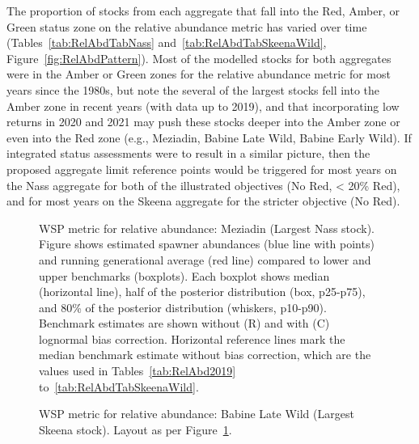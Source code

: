 \documentclass[french,11pt]{book}
\begin{document}
The proportion of stocks from each aggregate that fall into the Red, Amber, or Green status zone on the relative abundance metric has varied over time (Tables~\ref{tab:RelAbdTabNass} and~\ref{tab:RelAbdTabSkeenaWild}, Figure~\ref{fig:RelAbdPattern}). Most of the modelled stocks for both aggregates were in the Amber or Green zones for the relative abundance metric for most years since the 1980s, but note the several of the largest stocks fell into the Amber zone in recent years (with data up to 2019), and that incorporating low returns in 2020 and 2021 may push these stocks deeper into the Amber zone or even into the Red zone (e.g., Meziadin, Babine Late Wild, Babine Early Wild). If integrated status assessments were to result in a similar picture, then the proposed aggregate limit reference points would be triggered for most years on the Nass aggregate for both of the illustrated objectives (No Red, \textless{} 20\% Red), and for most years on the Skeena aggregate for the stricter objective (No Red).

\clearpage


\begin{figure}[htb]

{\centering {} 

}

\caption{WSP metric for relative abundance: Meziadin (Largest Nass stock). Figure shows estimated spawner abundances (blue line with points) and running generational average (red line) compared to lower and upper benchmarks (boxplots). Each boxplot shows median (horizontal line), half of the posterior distribution (box, p25-p75), and 80\% of the posterior distribution (whiskers, p10-p90). Benchmark estimates are shown without (R) and with (C) lognormal bias correction. Horizontal reference lines mark the median benchmark estimate without bias correction, which are the values used in Tables~\ref{tab:RelAbd2019} to~\ref{tab:RelAbdTabSkeenaWild}.}\label{fig:RelAbdMetricMeziadian}
\end{figure}
\clearpage


\begin{figure}[htb]

{\centering {} 

}

\caption{WSP metric for relative abundance: Babine Late Wild (Largest Skeena stock). Layout as per Figure~\ref{fig:RelAbdMetricMeziadian}.}\label{fig:RelAbdMetricBabLW}
\end{figure}
\clearpage
\end{document}
